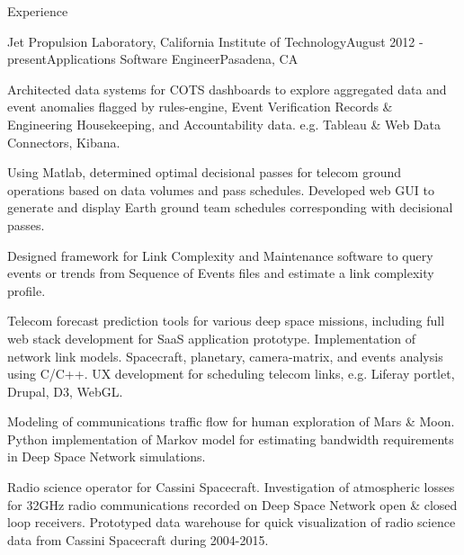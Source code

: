 \documentclass{resume} %
\begin{document}





\begin{rSection}{Experience}
\begin{rSubsection}{Jet Propulsion Laboratory, California Institute of Technology}{August 2012 - present}{Applications Software Engineer}{Pasadena, CA}
\item Architected data systems for COTS dashboards to explore aggregated data and event anomalies flagged by rules-engine, Event Verification Records \& Engineering Housekeeping, and Accountability data. e.g. Tableau \& Web Data Connectors, Kibana.
\item Using Matlab, determined optimal decisional passes for telecom ground operations based on data volumes and pass schedules. Developed web GUI to generate and display Earth ground team schedules corresponding with decisional passes.
\item Designed framework for Link Complexity and Maintenance software to query events or trends from Sequence of Events files and estimate a link complexity profile.
\item Telecom forecast prediction tools for various deep space missions, including full web stack development for SaaS application prototype. Implementation of network link models. Spacecraft, planetary, camera-matrix, and events analysis using C/C++. UX development for scheduling telecom links, e.g. Liferay portlet, Drupal, D3, WebGL. 
\item Modeling of communications traffic flow for human exploration of Mars \& Moon. Python implementation of Markov model for estimating bandwidth requirements in Deep Space Network simulations. 
\item Radio science operator for Cassini Spacecraft. Investigation of atmospheric losses for 32GHz radio communications recorded on Deep Space Network open \& closed loop receivers. Prototyped data warehouse for quick visualization of radio science data from Cassini Spacecraft during 2004-2015. 
\end{rSubsection}


\end{rSection}
\end{document}

